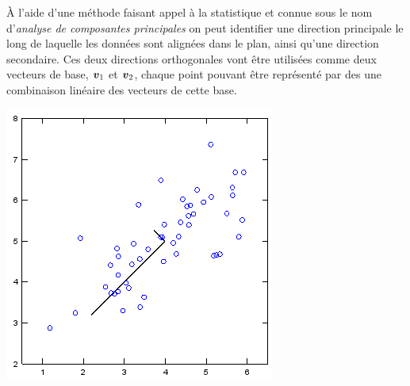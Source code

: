 \begin{adjmulticols}{1}{0in}{-2in}
\begin{center}
\begin{minipage}{0.9\textwidth}
À l'aide d'une méthode faisant appel à la statistique et connue sous le nom 
d'\textit{analyse de composantes principales} on peut identifier une direction
principale le long de laquelle les données sont alignées dans le plan,
ainsi qu'une direction secondaire. Ces deux directions orthogonales
vont être utilisées comme deux vecteurs de base, $\boldsymbol{v}_1$ et $\boldsymbol{v}_2$,
chaque point pouvant être représenté par des une combinaison linéaire
des vecteurs de cette base.
\end{minipage}
\hfill
\begin{minipage}{0.45\textwidth}
\includegraphics[width=\linewidth]{./images/pca_points2}
\end{minipage}
\end{center}



\end{adjmulticols}

